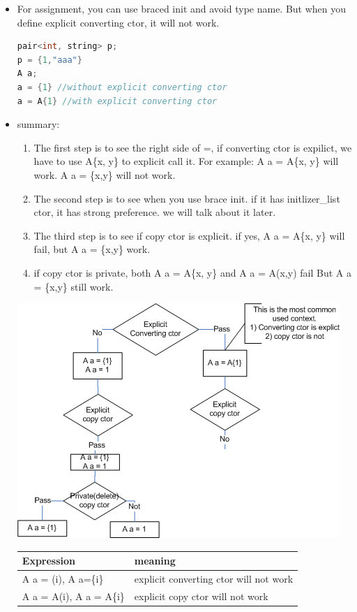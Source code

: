 \documentclass[a4paper,12pt,twoside]{book}
\begin{document}
\begin{itemize}
	\item For assignment, you can use braced init and avoid type name. But when you define explicit converting ctor, it will not work. 
\begin{lstlisting}[frame=single, language=c++]
pair<int, string> p;
p = {1,"aaa"}
A a;
a = {1} //without explicit converting ctor
a = A{1} //with explicit converting ctor
\end{lstlisting}


\item summary:
\begin{enumerate}
	\item The first step is to see the right side of =, if converting ctor is expilict, we have to use A\{x, y\} to explicit call it. For example: A a = A\{x, y\} will work. A a = \{x,y\} will not work. 
	
	\item The second step is to see when you use brace init. if it has initlizer\_list ctor, it has strong preference. we will talk about it later.
	
	\item The third step is to see if copy ctor is explicit. if yes, A a = A\{x, y\} will fail, but A a = \{x,y\} work.
	
	\item if copy ctor is private, both A a = A\{x, y\} and A a = A(x,y) fail But A a = \{x,y\} still work.
	
\end{enumerate}

	\includegraphics[scale=0.8]{pics/copy_init.png}

	\begin{tabular}{|p{}|p{}|}
	\hline
	Expression & meaning \\
	\hline
	A a = (i), A a=\{i\} & explicit converting ctor will not work \\
	\hline
	A a = A(i), A a = A\{i\} & explicit copy ctor will not work \\
	\hline
\end{tabular}


\end{itemize}
\end{document}
